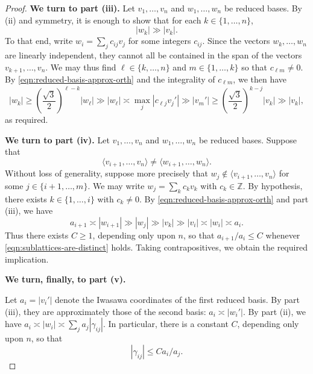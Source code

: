 \documentclass[reqno]{amsart} 
\begin{document}
\begin{proof}
  {\bf We turn to part (iii).}  Let $v_1,\dotsc,v_n$ and $w_1,\dotsc,w_n$ be reduced bases.  By (ii) and symmetry, it is enough to show that for each $k \in \{1, \dotsc, n\}$,
  \begin{equation*}
    |w_k| \gg |v_k|.
  \end{equation*}
  To that end, write $w_i = \sum_j c_{ij} v_j$ for some integers $c_{i j}$.  Since the vectors $w_k,\dotsc,w_n$ are linearly independent, they cannot all be contained in the span of the vectors $v_{k+1},\dotsc,v_n$.  We may thus find $\ell \in \{k,\dotsc,n\}$ and $m \in \{1,\dotsc,k\}$ so that $c_{\ell m} \neq 0$.  By \eqref{eqn:reduced-basis-approx-orth} and the integrality of $c_{\ell m}$, we then have
  \begin{equation*}
    |w_k| \geq \left( \frac{\sqrt{3}}{2} \right)^{\ell-k} |w_{\ell}| \gg |w_{\ell}| \asymp \max_j |c_{\ell j} v_j'| \gg |v_m'| \geq \left( \frac{\sqrt{3}}{2} \right)^{k-j} |v_k| \gg |v_k|,
  \end{equation*}
  as required.

  {\bf We turn to part (iv).}  Let $v_1,\dotsc,v_n$ and $w_1,\dotsc,w_n$ be reduced bases.  Suppose that
  \begin{equation}\label{eqn:sublattices-are-distinct}
    \langle v_{i+1},\dotsc,v_n \rangle \neq \langle
    w_{i+1},\dotsc, w_n \rangle.
  \end{equation}
  Without loss of generality, suppose more precisely that $w_j \notin \langle v_{i+1},\dotsc,v_n \rangle$ for some $j \in \{i+1,\dotsc,m\}$.  We may write $w_j = \sum_k c_k v_k$ with $c_k \in \mathbb{Z}$.  By hypothesis, there exists $k \in \{1, \dotsc, i\}$ with $c_k \neq 0$.  By \eqref{eqn:reduced-basis-approx-orth} and part (iii), we have
  \begin{equation*}
    a_{i+1} \asymp |w_{i+1}| \gg |w_j| \gg |v_k| \gg |v_i| \asymp |w_i| \asymp a_i.
  \end{equation*}
  Thus there exists $C \geq 1$, depending only upon $n$, so that $a_{i+1}/a_i \leq C$ whenever \eqref{eqn:sublattices-are-distinct} holds.  Taking contrapositives, we obtain the required implication.

  {\bf We turn, finally, to part (v).}
  
  Let $a_i = |v_i'|$ denote the Iwasawa coordinates of the first reduced basis.  By part (iii), they are approximately those of the second basis: $a_i \asymp |w_i'|$.  By part (ii), we have $a_i \asymp |w_i| \asymp \sum_j a_j |\gamma_{i j}|$.  In particular, there is a constant $C$, depending only upon $n$, so that
  \begin{equation}\label{eqn:gamma-ij-C-ai-aj}
    |\gamma_{i j}| \leq C a_i / a_j.
  \end{equation}


\end{proof}
\end{document}
